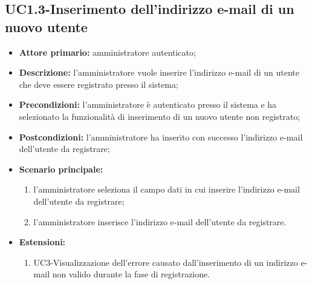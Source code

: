 \subsection{UC1.3-Inserimento dell'indirizzo e-mail di un nuovo utente}
\begin{itemize}
	\item \textbf{Attore primario:} amministratore autenticato;

	\item \textbf{Descrizione:} l'amministratore vuole inserire l'indirizzo e-mail di un utente che deve essere registrato presso il sistema;

	\item \textbf{Precondizioni:} l'amministratore è autenticato presso il sistema e ha selezionato la funzionalità di inserimento di un nuovo utente non registrato;

	\item \textbf{Postcondizioni:} l'amministratore ha inserito con successo l'indirizzo e-mail dell'utente da registrare;

	\item \textbf{Scenario principale:}
		\begin{enumerate}
   		 	\item l'amministratore seleziona il campo dati in cui inserire l'indirizzo e-mail dell'utente da registrare;
    		\item l'amministratore inserisce l'indirizzo e-mail dell'utente da registrare.
		\end{enumerate}
	
	\item \textbf{Estensioni:}
		\begin{enumerate}
    		\item UC3-Visualizzazione dell'errore causato dall'inserimento di un indirizzo e-mail non valido durante la fase di registrazione.
		\end{enumerate}
\end{itemize}
